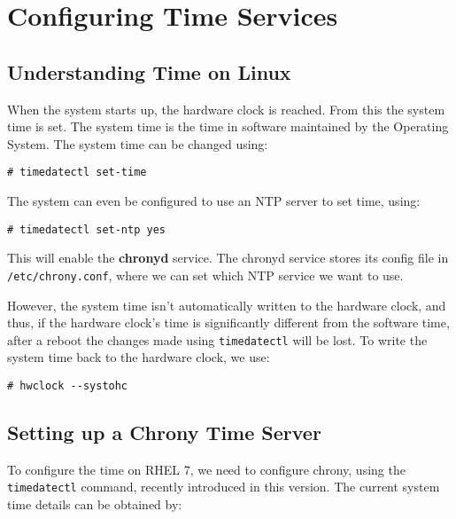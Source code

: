 \chapter{Configuring Time Services}

\section{Understanding Time on Linux}
When the system starts up, the hardware clock is reached. From this the system time is set. The system time is the time in software maintained by the Operating System. The system time can be changed using:

\vspace{-15pt}
\begin{verbatim}
# timedatectl set-time
\end{verbatim}
\vspace{-10pt}

\noindent
The system can even be configured to use an NTP server to set time, using:

\vspace{-15pt}
\begin{verbatim}
# timedatectl set-ntp yes
\end{verbatim}
\vspace{-10pt}

\noindent
This will enable the \textbf{chronyd} service. The chronyd service stores its config file in \verb|/etc/chrony.conf|, where we can set which NTP service we want to use. 

However, the system time isn't automatically written to the hardware clock, and thus, if the hardware clock's time is significantly different from the software time, after a reboot the changes made using \verb|timedatectl| will be lost. To write the system time back to the hardware clock, we use:

\vspace{-15pt}
\begin{verbatim}
# hwclock --systohc
\end{verbatim}
\vspace{-10pt}	

\section{Setting up a Chrony Time Server}
To configure the time on RHEL 7, we need to configure chrony, using the \verb|timedatectl| command, recently introduced in this version. The current system time details can be obtained by:

